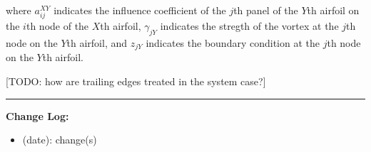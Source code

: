\documentclass[]{article}
\begin{document}
\noindent where \(a_{ij}^{XY}\) indicates the influence coefficient of the \(j\)th panel of the \(Y\)th airfoil on the \(i\)th node of the \(X\)th airfoil, \(\gamma_{jY}\) indicates the stregth of the vortex at the \(j\)th node on the \(Y\)th airfoil, and \(z_{jY}\) indicates the boundary condition at the \(j\)th node on the \(Y\)th airfoil.

[TODO: how are trailing edges treated in the system case?]

\newpage

{}


\vspace{1cm}
\hrule
\vspace{1cm}

\noindent  \textbf{Change Log:}

\begin{itemize}
	\item (date): change(s)
\end{itemize}
\end{document}
